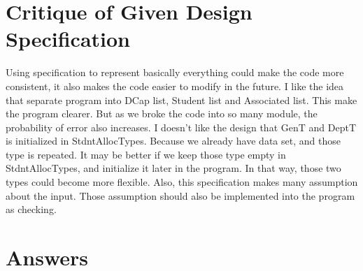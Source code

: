 \documentclass[12pt]{article}
\begin{document}
\section{Critique of Given Design Specification}

Using specification to represent basically everything could make the code more consistent, it also makes the code easier to modify in the future. I like the idea that separate program into DCap list, Student list and Associated list. This make the program clearer. But as we broke the code into so many module, the probability of error also increases. I doesn't like the design that GenT and DeptT is initialized in StdntAllocTypes. Because we already have data set, and those type is repeated. It may be better if we keep those type empty in StdntAllocTypes, and initialize it later in the program. In that way, those two types could become more flexible. Also, this specification makes many assumption about the input. Those assumption should also be implemented into the program as checking.

\section{Answers}
\end{document}
